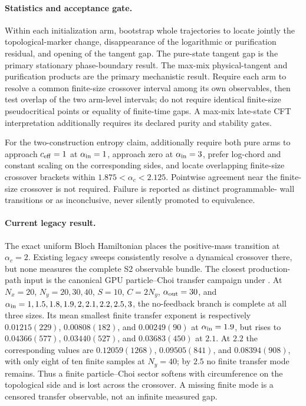 \documentclass[aps,prx,twocolumn,floatfix,nofootinbib,superscriptaddress,longbibliography]{revtex4-2}
\begin{document}
\paragraph*{Statistics and acceptance gate.}
Within each initialization arm, bootstrap whole trajectories to locate jointly the
topological-marker change, disappearance of the logarithmic or purification residual,
and opening of the tangent gap.  The pure-state tangent gap is the primary stationary
phase-boundary result.  The max-mix physical-tangent and purification products are the primary
mechanistic result.  Require each arm to resolve a common finite-size crossover interval
among its own observables, then test overlap of the two arm-level intervals; do not require
identical finite-size pseudocritical points or equality of finite-time gaps.  A max-mix
late-state CFT interpretation additionally requires its declared purity and stability
gates.

For the two-construction entropy claim, additionally require both pure arms to approach
$c_{\rm eff}=1$ at $\alpha_{\rm in}=1$, approach zero at $\alpha_{\rm in}=3$, prefer
log-chord and constant scaling on the corresponding sides, and locate overlapping
finite-size crossover brackets within $1.875<\alpha_c<2.125$.  Pointwise agreement near
the finite-size crossover is not required.  Failure is reported as distinct programmable-
wall transitions or as inconclusive, never silently promoted to equivalence.

\paragraph*{Current legacy result.}
The exact uniform Bloch Hamiltonian places the positive-mass transition at
$\alpha_c=2$.  Existing legacy sweeps consistently resolve a dynamical crossover there,
but none measures the complete S2 observable bundle.  The closest production-path input
is the canonical GPU particle--Choi transfer campaign under
.  At $N_x=20$, $N_y=20,30,40$, $S=10$,
$C=2N_y$, $\alpha_{\rm out}=30$, and
$\alpha_{\rm in}=1,1.5,1.8,1.9,2,2.1,2.2,2.5,3$, the no-feedback branch is complete at
all three sizes.  Its mean smallest finite transfer exponent is respectively
$0.01215(229)$, $0.00808(182)$, and $0.00249(90)$ at $\alpha_{\rm in}=1.9$, but rises to
$0.04366(577)$, $0.03440(527)$, and $0.03683(450)$ at $2.1$.  At $2.2$ the corresponding
values are $0.12059(1268)$, $0.09505(841)$, and $0.08394(908)$, with only eight of ten
finite samples at $N_y=40$; by $2.5$ no finite transfer mode remains.  Thus a finite
particle--Choi sector softens with circumference on the topological side and is lost
across the crossover.  A missing finite mode is a censored transfer observable, not an
infinite measured gap.
\end{document}
